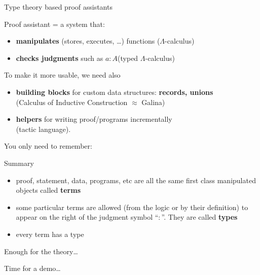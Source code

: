 \documentclass[compress,11pt]{beamer}
\begin{document}
\begin{frame}{Type theory based proof assistants}

  Proof assistant = a system that:
    \pause\medskip

  \begin{itemize}
  \item \textbf{manipulates} (stores, executes, \dots) functions
    \hfill ($\Lambda$-calculus)
    \medskip

  \item \textbf{checks judgments} such as $a : A$\hfill(typed $\Lambda$-calculus)
  \end{itemize}
  \pause\medskip

  To make it more usable, we need also
  \begin{itemize}
  \item \textbf{building blocks} for custom data structures: \textbf{records,
      unions} \\
    \hfill (Calculus of Inductive Construction $\approx$ Galina)

  \item \textbf{helpers} for writing proof/programs incrementally \\
    \hfill (tactic language).
  \end{itemize}
\end{frame}

\begin{frame}

  You only need to remember:
  \begin{block}{Summary}
    \begin{itemize}
    \item proof, statement, data, programs, etc are all the same first class
      manipulated objects called \textbf{terms}
    \item some particular terms are allowed (from the logic or by their
      definition) to appear on the right of the judgment symbol ``$:$''. They
      are called \textbf{types}
    \item every term has a type
    \end{itemize}

  \end{block}
  \pause

  \Huge\bf

  Enough for the theory\dots
  \bigskip

  \hspace{2cm}Time for a demo\dots
\end{frame}
\end{document}
